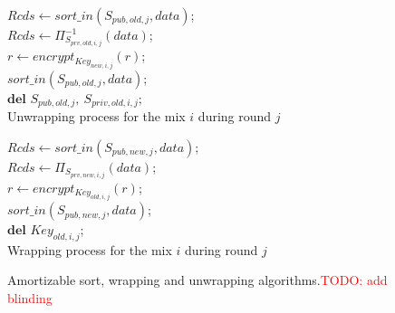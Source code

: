 \documentclass{llncs}
\newcommand{\todo}[1]{\textcolor{red}{TODO: #1}}
\begin{document}
\begin{figure}
\begin{minipage}[t]{0.475\textwidth}
\vspace{0pt}
\centering 
\begin{algorithm}[H]
\DontPrintSemicolon
{}
$Rcds \gets sort\_in(S_{pub,old,j}, data)$;\\
$Rcds \gets {\Pi}_{S_{prv,old,i,j}}^{-1} (data)$;\\
{
	$r \gets encrypt_{Key_{new,i,j}}\left( r \right )$;\\
}
$sort\_in(S_{pub,old,j}, data)$;\\
$\textbf{del } S_{pub,old,j},\ S_{priv,old,i,j}$;\\
\caption{Unwrapping process for the mix $i$ during round $j$}
\label{alg:UAS}
\end{algorithm}
\end{minipage}
\hfill
\begin{minipage}[t]{0.475\textwidth}
\vspace{0pt}
\centering
\begin{algorithm}[H]
\DontPrintSemicolon
{}
$Rcds \gets sort\_in(S_{pub,new,j}, data)$;\\
$Rcds \gets {\Pi}_{S_{prv,new,i,j}} (data)$;\\
{
	$r \gets encrypt_{Key_{old,i,j}}\left( r \right )$;\\
}
$sort\_in(S_{pub,new,j}, data)$;\\
$\textbf{del } Key_{old,i,j}$;\\
\caption{Wrapping process for the mix $i$ during round $j$}
\label{alg:WAS}
\end{algorithm}
\end{minipage}
\caption{Amortizable sort, wrapping and unwrapping algorithms.\todo{add blinding}}
\end{figure}
\end{document}
